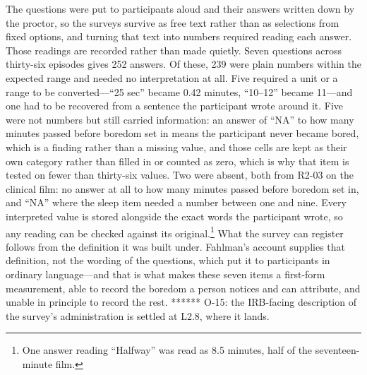 The questions were put to participants aloud and their answers written down by the proctor, so
the surveys survive as free text rather than as selections from fixed options, and turning that
text into numbers required reading each answer. Those readings are recorded rather than made
quietly. Seven questions across thirty-six episodes gives 252 answers. Of these, 239 were
plain numbers within the expected range and needed no interpretation at all. Five required a
unit or a range to be converted---``25 sec'' became 0.42 minutes, ``10--12'' became 11---and one
had to be recovered from a sentence the participant wrote around it. Five were not numbers but
still carried information: an answer of ``NA'' to how many minutes passed before boredom set in
means the participant never became bored, which is a finding rather than a missing value, and
those cells are kept as their own category rather than filled in or counted as zero, which is
why that item is tested on fewer than thirty-six values. Two were absent, both from R2-03 on the clinical film: no answer at all to how many minutes
passed before boredom set in, and ``NA'' where the sleep item needed a number between one and
nine. Every
interpreted value is stored alongside the exact words the participant wrote, so any reading can
be checked against its original.\footnote{One answer reading ``Halfway'' was read as 8.5
minutes, half of the seventeen-minute film.} What the survey can register follows from the
definition it was built under. Fahlman's account supplies that definition, not the wording of
the questions, which put it to participants in ordinary language---and that is what makes these
seven items a first-form measurement, able to record the boredom a person notices and can
attribute, and unable in principle to record the rest. ****** O-15: the IRB-facing description
of the survey's administration is settled at L2.8, where it lands.

